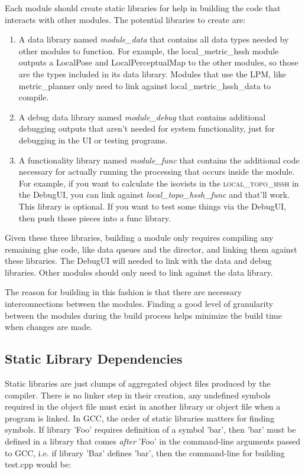 \documentclass{article}
\begin{document}
Each module should create static libraries for help in building the code that interacts with other modules. The 
potential libraries to create are:

\begin{enumerate}
 \item A data library named \emph{module\_data} that contains all data types needed by other modules to function. For 
  example, the local\_metric\_hssh module outputs a LocalPose and LocalPerceptualMap to the other modules, so those are 
  the types included in its data library. Modules that use the LPM, like metric\_planner only need to link against 
  local\_metric\_hssh\_data to compile.
  
 \item A debug data library named \emph{module\_debug} that contains additional debugging outputs that aren't needed for 
  system functionality, just for debugging in the UI or testing programs.
  
 \item A functionality library named \emph{module\_func} that contains the additional code necessary for actually 
  running the processing that occurs inside the module. For example, if you want to calculate the isovists in the 
  \textsc{local\_topo\_hssh} in the DebugUI, you can link against   \emph{local\_topo\_hssh\_func} and that'll work. 
  This library is optional. If you want to test some things via the   DebugUI, then push those pieces into a func 
  library.
\end{enumerate}

Given these three libraries, building a module only requires compiling any remaining glue code, like data queues and the 
director, and linking them against these libraries. The DebugUI will needed to link with the data and debug libraries. 
Other modules should only need to link against the data library.

The reason for building in this fashion is that there are necessary interconnections between the modules. Finding a good 
level of granularity between the modules during the build process helps minimize the build time when changes are made.

\subsection{Static Library Dependencies}
Static libraries are just clumps of aggregated object files produced by the compiler. There is no linker step in their 
creation, any undefined symbols required in the object file must exist in another library or object file when a program 
is linked. In GCC, the order of static libraries matters for finding symbols. If library 'Foo' requires definition of a 
symbol 'bar', then 'bar' must be defined in a library that comes \emph{after} 'Foo' in the command-line arguments passed 
to GCC, i.e. if library 'Baz' defines 'bar', then the command-line for building test.cpp would be:
\end{document}

